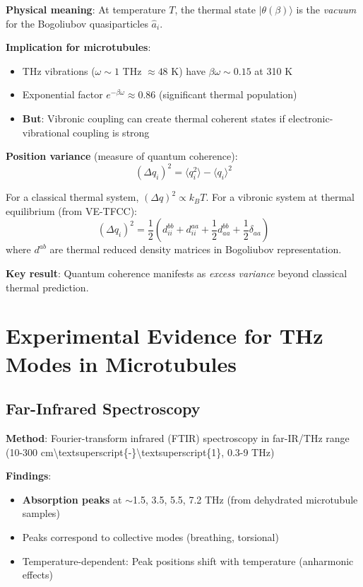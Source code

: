 \textbf{Physical meaning}: At temperature \(T\), the thermal state
\(|\theta(\beta)\rangle\) is the \emph{vacuum} for the Bogoliubov
quasiparticles \(\hat{a}_i\).

\textbf{Implication for microtubules}:
\begin{itemize}
\item THz vibrations ($\omega \sim 1$ THz $\approx 48$ K) have $\beta \omega \sim 0.15$ at 310 K
\item Exponential factor $e^{-\beta \omega} \approx 0.86$ (significant thermal population)
\item \textbf{But}: Vibronic coupling can create thermal coherent states if electronic-vibrational coupling is strong
\end{itemize}

\textbf{Position variance} (measure of quantum coherence):
\begin{equation}
\label{eq:position-variance}
(\Delta q_i)^2 = \langle q_i^2 \rangle - \langle q_i \rangle^2
\end{equation}

For a classical thermal system, $(\Delta q)^2 \propto k_B T$. For a vibronic system at thermal equilibrium (from VE-TFCC):
\[(\Delta q_i)^2 = \frac{1}{2} \left( d_{ii}^{bb} + d_{ii}^{aa} + \frac{1}{2} d_{aa}^{bb} + \frac{1}{2} \delta_{aa} \right)\]
where $d^{ab}$ are thermal reduced density matrices in Bogoliubov representation.

\textbf{Key result}: Quantum coherence manifests as \emph{excess
variance} beyond classical thermal prediction.



\section{Experimental Evidence for THz Modes in Microtubules}\label{experimental-evidence-for-thz-modes-in-microtubules}

\subsection{Far-Infrared Spectroscopy}\label{far-infrared-spectroscopy-established}

\textbf{Method}: Fourier-transform infrared (FTIR) spectroscopy in
far-IR/THz range (10-300
cm\textbackslash textsuperscript\{-\}\textbackslash textsuperscript\{1\},
0.3-9 THz)

\textbf{Findings}:
\begin{itemize}
\item \textbf{Absorption peaks} at $\sim$1.5, 3.5, 5.5, 7.2 THz (from dehydrated microtubule samples)
\item Peaks correspond to collective modes (breathing, torsional)
\item Temperature-dependent: Peak positions shift with temperature (anharmonic effects)
\end{itemize}

